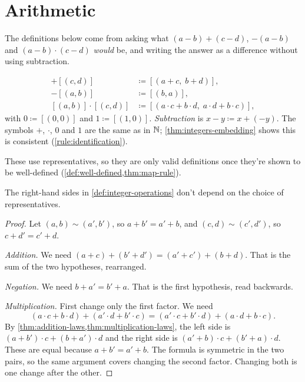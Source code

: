 \section{Arithmetic}

The definitions below come from asking what $(a - b) + (c - d)$, $-(a - b)$ and
$(a - b) \cdot (c - d)$ \emph{would} be, and writing the answer as a difference
without using subtraction.

\begin{definition}[Operations on $\Z$]
\label{def:integer-operations}
\begin{align*}
  [(a, b)] + [(c, d)] &\coloneqq [(a + c,\; b + d)], \\
  -[(a, b)] &\coloneqq [(b, a)], \\
  [(a, b)] \cdot [(c, d)] &\coloneqq [(a \cdot c + b \cdot d,\; a \cdot d + b \cdot
  c)],
\end{align*}
with $0 \coloneqq [(0, 0)]$ and $1 \coloneqq [(1, 0)]$. \emph{Subtraction} is $x -
y \coloneqq x + (-y)$. The symbols $+$, $\cdot$, $0$ and $1$ are the same as in
$\mathbb{N}$; \cref{thm:integers-embedding} shows this is consistent
(\cref{rule:identification}).
\end{definition}

These use representatives, so they are only valid definitions once they're shown
to be well-defined (\cref{def:well-defined,thm:map-rule}).

\begin{lemma}
\label{lem:integer-well-defined}
The right-hand sides in \cref{def:integer-operations} don't depend on the choice
of representatives.
\end{lemma}

\begin{proof}
Let $(a, b) \sim (a', b')$, so $a + b' = a' + b$, and $(c, d) \sim (c', d')$, so $c
+ d' = c' + d$.

\emph{Addition.} We need $(a + c) + (b' + d') = (a' + c') + (b + d)$. That is the
sum of the two hypotheses, rearranged.

\emph{Negation.} We need $b + a' = b' + a$. That is the first hypothesis, read
backwards.

\emph{Multiplication.} First change only the first factor. We need
\[
  (a \cdot c + b \cdot d) + (a' \cdot d + b' \cdot c) = (a' \cdot c + b' \cdot d) +
  (a \cdot d + b \cdot c).
\]
By \cref{thm:addition-laws,thm:multiplication-laws}, the left side is $(a + b')
\cdot c + (b + a') \cdot d$ and the right side is $(a' + b) \cdot c + (b' + a)
\cdot d$. These are equal because $a + b' = a' + b$. The formula is symmetric in
the two pairs, so the same argument covers changing the second factor. Changing
both is one change after the other.
\end{proof}

